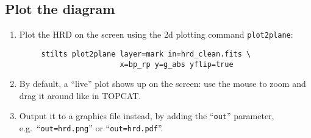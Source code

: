 \documentclass{article}
\newcommand{\winfig}[2]
           {\vspace*{-0.5cm}
            \hspace*{0.5cm}\mbox{\vtop{\hbox{\texttt{[image: \#2]}}}}}
\begin{document}
\begin{minipage}[t]{11cm}
  \raggedright
  \vspace*{1ex}
  \subsection{Plot the diagram}

  \begin{enumerate}
  \item Plot the HRD on the screen using
        the 2d plotting command {\tt plot2plane}:
  \vspace*{-1ex}
  \begin{verbatim}
     stilts plot2plane layer=mark in=hrd_clean.fits \
                       x=bp_rp y=g_abs yflip=true
  \end{verbatim}
  \vspace*{-4ex}
  \item By default, a ``live'' plot shows up on the screen:
        use the mouse to zoom and drag it around like in TOPCAT.
  \item Output it to a graphics file instead,
        by adding the ``{\tt out}'' parameter,
        e.g.\ ``{\tt out=hrd.png}'' or ``{\tt out=hrd.pdf}''.
  \end{enumerate}
\end{minipage}
\begin{minipage}[t]{8cm}
  \begin{flushright}
  \vspace*{-0.6cm}
  \winfig{width=6cm}{hrd_plot2plane.png}
  \end{flushright}
\end{minipage}
\end{document}
